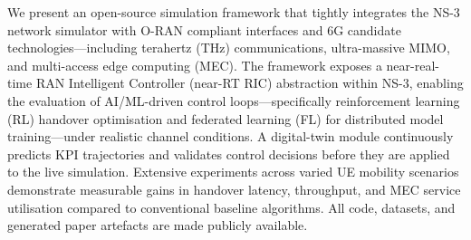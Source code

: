 We present an open-source simulation framework that tightly integrates the
NS-3 network simulator with O-RAN compliant interfaces and 6G candidate
technologies---including terahertz (THz) communications, ultra-massive MIMO,
and multi-access edge computing (MEC).
The framework exposes a near-real-time RAN Intelligent Controller (near-RT
RIC) abstraction within NS-3, enabling the evaluation of AI/ML-driven control
loops---specifically reinforcement learning (RL) handover optimisation and
federated learning (FL) for distributed model training---under realistic
channel conditions.
A digital-twin module continuously predicts KPI trajectories and validates
control decisions before they are applied to the live simulation.
Extensive experiments across varied UE mobility scenarios demonstrate
measurable gains in handover latency, throughput, and MEC service utilisation
compared to conventional baseline algorithms.
All code, datasets, and generated paper artefacts are made publicly available.
